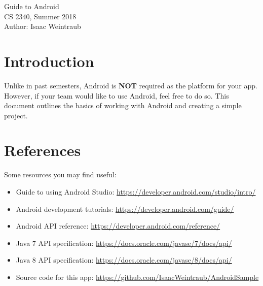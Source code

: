 \documentclass{article}
\begin{document}
\begin{center}
{\huge Guide to Android}\\[0.5 cm]
{\large CS 2340, Summer 2018}\\[0.2 cm]
{\large Author: Isaac Weintraub}\\[0.2 cm]
\end{center}
\tableofcontents
\newpage
\section{Introduction}
Unlike in past semesters, Android is \textbf{NOT} required as the platform for your app. However, if your team would like to use Android, feel free to do so. This document outlines the basics of working with Android and creating a simple project.

\section{References}
Some resources you may find useful:
\begin{itemize}
\item Guide to using Android Studio: \url{https://developer.android.com/studio/intro/} 
\item Android development tutorials: \url{https://developer.android.com/guide/} 
\item Android API reference: \url{https://developer.android.com/reference/}
\item Java 7 API specification: \url{https://docs.oracle.com/javase/7/docs/api/} 
\item Java 8 API specification: \url{https://docs.oracle.com/javase/8/docs/api/}
\item Source code for this app: \url{https://github.com/IsaacWeintraub/AndroidSample} 
\end{itemize}
\end{document}
